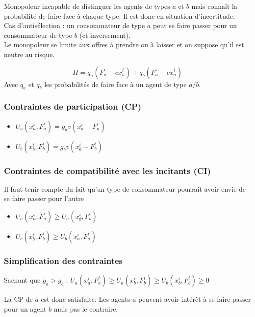Monopoleur incapable de distinguer les agents de types $a$ et $b$ mais connaît la probabilité de faire face à chaque type. Il est donc en situation d'incertitude.\\
\warning Cas d'antisélection : un consommateur de type $a$ peut se faire passer pour un consommateur de type $b$ (et inversement).\\
Le monopoleur se limite aux offres à prendre ou à laisser et on suppose qu'il est neutre au risque.

\begin{equation*}
\Pi = q_a(F^i_a - c x^i_a) + q_b(F^i_a - c x^i_a)
\end{equation*}
Avec $q_a$ et $q_b$ les probabilités de faire face à un agent de type $a$/$b$.

\subsubsection{Contraintes de participation (CP)}

\begin{itemize}
\item $U_a(x^i_a, F^i_a) = g_a v(x^i_a - F^i_a)$
\item $U_b(x^i_b, F^i_b) = g_b v(x^i_b - F^i_b)$
\end{itemize}

\subsubsection{Contraintes de compatibilité avec les incitants (CI)}

Il faut tenir compte du fait qu'un type de consommateur pourrait avoir envie de se faire passer pour l'autre
\begin{itemize}
\item $U_a(x^i_a, F^i_a) \geq U_a(x^i_b, F^i_b)$
\item $U_b(x^i_b, F^i_b) \geq U_b(x^i_a, F^i_a)$
\end{itemize}

\subsubsection{Simplification des contraintes}

Sachant que $g_a > g_b$ : $U_a(x^i_a, F^i_a) \geq U_a(x^i_b, F^i_b) \geq U_b(x^i_b, F^i_b) \geq 0$

La CP de $a$ est donc satisfaite. Les agents $a$ peuvent avoir intérêt à se faire passer pour un agent $b$ mais pas le contraire.

